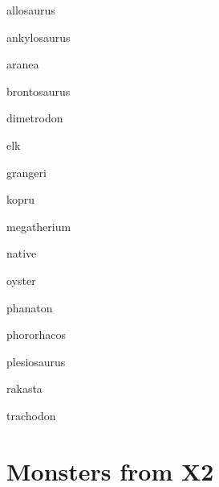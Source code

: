 \documentclass[letterpaper,serif]{module}
\begin{document}
\begin{newmonster}{allosaurus}\end{newmonster}
\begin{newmonster}{ankylosaurus}\end{newmonster}
\begin{newmonster}{aranea}\end{newmonster}
\begin{newmonster}{brontosaurus}\end{newmonster}
\begin{newmonster}{dimetrodon}\end{newmonster}
\begin{newmonster}{elk}\end{newmonster}
\begin{newmonster}{grangeri}\end{newmonster}
\begin{newmonster}{kopru}\end{newmonster}
\begin{newmonster}{megatherium}\end{newmonster}
\begin{newmonster}{native}\end{newmonster}
\begin{newmonster}{oyster}\end{newmonster}
\begin{newmonster}{phanaton}\end{newmonster}
\begin{newmonster}{phororhacos}\end{newmonster}
\begin{newmonster}{plesiosaurus}\end{newmonster}
\begin{newmonster}{rakasta}\end{newmonster}
\begin{newmonster}{trachodon}\end{newmonster}

\part{Monsters from X2}
\end{document}
